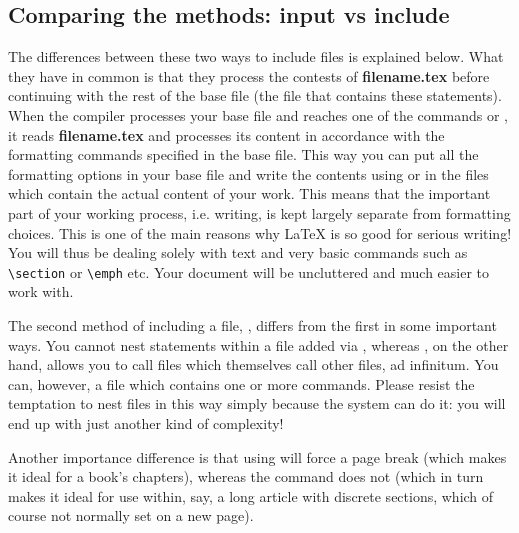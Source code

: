 \begin{lstlisting}[language={[LaTeX]TeX}]

\end{lstlisting}

\subsection{Comparing the methods: input vs include}
The differences between these two ways to include files is explained below. What they have in common is that they process the contests of \textbf{filename.tex} before continuing with the rest of the base file (the file that contains these statements). When the compiler processes your base file and reaches one of the commands \lstinline[language={[LaTeX]TeX}]|| or \lstinline[language={[LaTeX]TeX}]||, it reads \textbf{filename.tex} and processes its content in accordance with the formatting commands specified in the base file. This way you can put all the formatting options in your base file and write the contents using \lstinline[language={[LaTeX]TeX}]|| or \lstinline[language={[LaTeX]TeX}]|| in the files which contain the actual content of your work. This means that the important part of your working process, i.e. writing, is kept largely separate from formatting choices. This is one of the main reasons why \LaTeX{} is so good for serious writing! You will thus be dealing solely with text and very basic commands such as \lstinline[language={[LaTeX]TeX}]|\section| or \lstinline[language={[LaTeX]TeX}]|\emph| etc. Your document will be uncluttered and much easier to work with.

The second method of including a file, \lstinline[language={[LaTeX]TeX}]||, differs from the first in some important ways. You cannot nest \lstinline[language={[LaTeX]TeX}]|| statements within a file added via \lstinline[language={[LaTeX]TeX}]||, whereas \lstinline[language={[LaTeX]TeX}]||, on the other hand, allows you to call files which themselves call other files, ad infinitum. You can, however, \lstinline[language={[LaTeX]TeX}]|| a file which contains one or more \lstinline[language={[LaTeX]TeX}]|| commands. Please resist the temptation to nest files in this way simply because the system can do it: you will end up with just another kind of complexity!

Another importance difference is that using \lstinline[language={[LaTeX]TeX}]|| will force a page break (which makes it ideal for a book's chapters), whereas the \lstinline[language={[LaTeX]TeX}]|| command does not (which in turn makes it ideal for use within, say, a long article with discrete sections, which of course not normally set on a new page).

